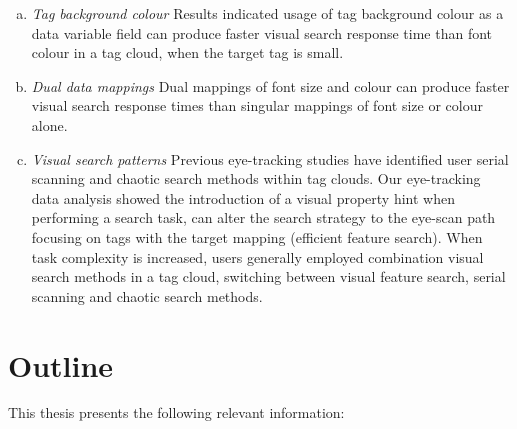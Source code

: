 \begin{itemize}
	\begin{enumerate}[(a)] 
		\item \emph{Tag background colour} Results indicated usage of tag background colour as a data variable field can produce faster visual search response time than font colour in a tag cloud, when the target tag is small. 
		\item \emph{Dual data mappings} Dual mappings of font size and colour can produce faster visual search response times than singular mappings of font size or colour alone.
		\item \emph{Visual search patterns} Previous eye-tracking studies have identified user serial scanning and chaotic search methods within tag clouds.  Our eye-tracking data analysis showed the introduction of a visual property hint when performing a search task, can alter the search strategy to the eye-scan path focusing on tags with the target mapping (efficient feature search). When task complexity is increased, users generally employed combination visual search methods in a tag cloud, switching between visual feature search, serial scanning and chaotic search methods.
       \end{enumerate}
\end{itemize}

\section{Outline}

This thesis presents the following relevant information:

